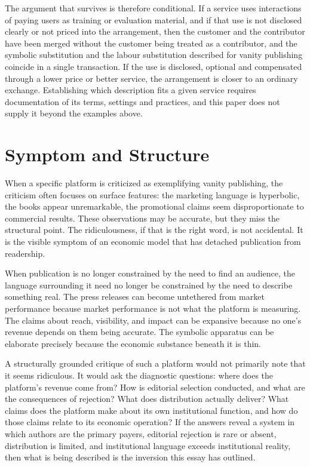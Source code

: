 \documentclass[12pt, a4paper]{article}
\begin{document}
The argument that survives is therefore conditional. If a service uses interactions of paying users as training or evaluation material, and if that use is not disclosed clearly or not priced into the arrangement, then the customer and the contributor have been merged without the customer being treated as a contributor, and the symbolic substitution and the labour substitution described for vanity publishing coincide in a single transaction. If the use is disclosed, optional and compensated through a lower price or better service, the arrangement is closer to an ordinary exchange. Establishing which description fits a given service requires documentation of its terms, settings and practices, and this paper does not supply it beyond the examples above.

\section{Symptom and Structure}

When a specific platform is criticized as exemplifying vanity publishing, the criticism often focuses on surface features: the marketing language is hyperbolic, the books appear unremarkable, the promotional claims seem disproportionate to commercial results. These observations may be accurate, but they miss the structural point. The ridiculousness, if that is the right word, is not accidental. It is the visible symptom of an economic model that has detached publication from readership.

When publication is no longer constrained by the need to find an audience, the language surrounding it need no longer be constrained by the need to describe something real. The press releases can become untethered from market performance because market performance is not what the platform is measuring. The claims about reach, visibility, and impact can be expansive because no one's revenue depends on them being accurate. The symbolic apparatus can be elaborate precisely because the economic substance beneath it is thin.

A structurally grounded critique of such a platform would not primarily note that it seems ridiculous. It would ask the diagnostic questions: where does the platform's revenue come from? How is editorial selection conducted, and what are the consequences of rejection? What does distribution actually deliver? What claims does the platform make about its own institutional function, and how do those claims relate to its economic operation? If the answers reveal a system in which authors are the primary payers, editorial rejection is rare or absent, distribution is limited, and institutional language exceeds institutional reality, then what is being described is the inversion this essay has outlined.
\end{document}
